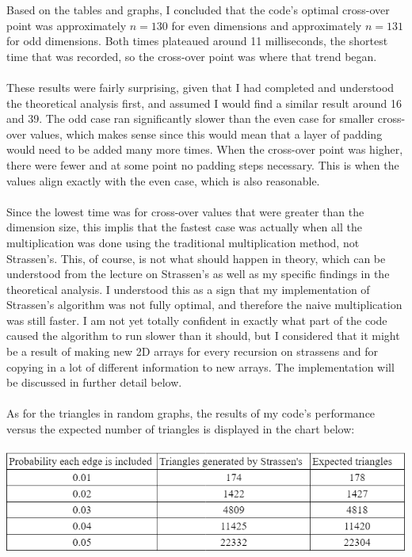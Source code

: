 \documentclass[11pt]{article}
\begin{document}
Based on the tables and graphs, I concluded that the code's optimal cross-over point was approximately $n = 130$ for even dimensions and approximately $n = 131$ for odd dimensions. Both times plateaued around 11 milliseconds, the shortest time that was recorded, so the cross-over point was where that trend began. \\\\
These results were fairly surprising, given that I had completed and understood the theoretical analysis first, and assumed I would find a similar result around 16 and 39. The odd case ran significantly slower than the even case for smaller cross-over values, which makes sense since this would mean that a layer of padding would need to be added many more times. When the cross-over point was higher, there were fewer and at some point no padding steps necessary. This is when the values align exactly with the even case, which is also reasonable. \\\\
Since the lowest time was for cross-over values that were greater than the dimension size, this implis that the fastest case was actually when all the multiplication was done using the traditional multiplication method, not Strassen's. This, of course, is not what should happen in theory, which can be understood from the lecture on Strassen's as well as my specific findings in the theoretical analysis. I understood this as a sign that my implementation of Strassen's algorithm was not fully optimal, and therefore the naive multiplication was still faster. I am not yet totally confident in exactly what part of the code caused the algorithm to run slower than it should, but I considered that it might be a result of making new 2D arrays for every recursion on strassens and for copying in a lot of different information to new arrays. The implementation will be discussed in further detail below. \\\\

As for the triangles in random graphs, the results of my code's performance versus the expected number of triangles is displayed in the chart below: \\\\
\includegraphics{triangles}
\end{document}
